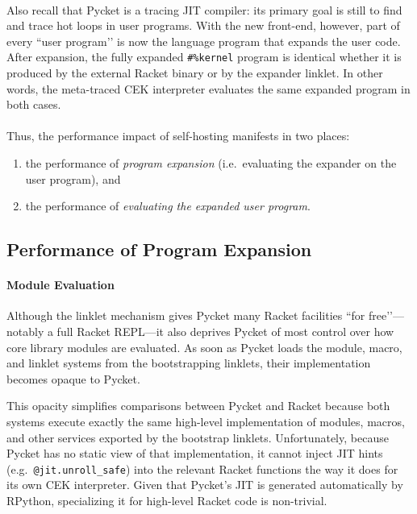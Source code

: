 		\paragraph{}%
		 Also recall that Pycket is a tracing JIT compiler: its primary goal is still to find and trace hot loops in user programs.  With the new front-end, however, part of every “user program’’ is now the language program that expands the user code. After expansion, the fully expanded \verb|#%kernel| program is identical whether it is produced by the external Racket binary or by the expander linklet. In other words, the meta-traced CEK interpreter evaluates the same expanded program in both cases.

		\paragraph{}%
		 Thus, the performance impact of self-hosting manifests in two places:
		\begin{enumerate}
		\item the performance of \emph{program expansion} (i.e.\ evaluating the expander on the user program), and
		\item the performance of \emph{evaluating the expanded user program}.
		\end{enumerate}

		\subsection{Performance of Program Expansion}

			\paragraph{Module Evaluation}%
			Although the linklet mechanism gives Pycket many Racket facilities “for free’’—notably a full Racket REPL—it also deprives Pycket of most control over how core library modules are evaluated.  As soon as Pycket loads the module, macro, and linklet systems from the bootstrapping linklets, their implementation becomes opaque to Pycket.

			This opacity simplifies comparisons between Pycket and Racket because both systems execute exactly the same high-level implementation of modules, macros, and other services exported by the bootstrap linklets.  Unfortunately, because Pycket has no static view of that implementation, it cannot inject JIT hints (e.g.\ \verb|@jit.unroll_safe|) into the relevant Racket functions the way it does for its own CEK interpreter.  Given that Pycket’s JIT is generated automatically by RPython, specializing it for high-level Racket code is non-trivial.


